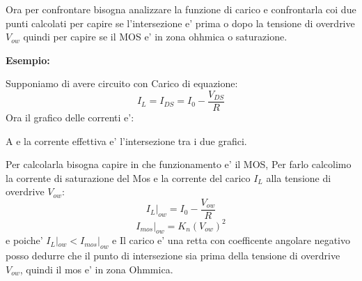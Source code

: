 \documentclass[\main/main.tex]{subfiles}
\begin{document}
Ora per confrontare bisogna analizzare la funzione di carico e confrontarla coi due punti calcolati per capire se l'intersezione e' prima o dopo la tensione di overdrive $V_{ow}$ quindi per capire se il MOS e' in zona ohhmica o saturazione.

\textbf{Esempio:}

Supponiamo di avere circuito con Carico di equazione:
\[I_L = I_{DS} = I_0 - \frac{V_{DS}}{R}\]
Ora il grafico delle correnti e':

\begin{center}
\end{center}

A e la corrente effettiva e' l'intersezione tra i due grafici.

Per calcolarla bisogna capire in che funzionamento e' il MOS, Per farlo calcolimo la corrente di saturazione del Mos e la corrente del carico $I_L$ alla tensione di overdrive $V_{ow}$:
\[I_L|_{ow} = I_0 - \frac{V_{ow}}{R}\]
\[ I_{mos}|_{ow} = K_n \left(V_{ow} \right)^2\]
e poiche' $I_L|_{ow} < I_{mos}|_{ow}$ e Il carico e' una retta con coefficente angolare negativo posso dedurre che il punto di intersezione sia prima della tensione di overdrive $V_{ow}$, quindi il mos e' in zona Ohmmica.
\end{document}
